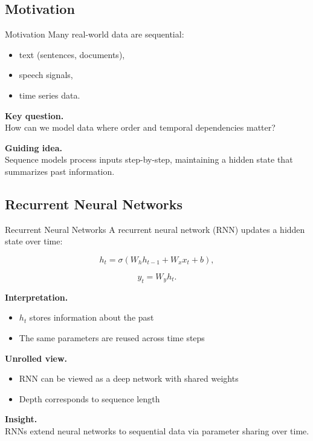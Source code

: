 \documentclass[aspectratio=169,11pt]{beamer}
\begin{document}
\subsection{Motivation}
\begin{frame}[t,allowframebreaks]{Motivation}
\small
Many real-world data are sequential:

\begin{itemize}
    \item text (sentences, documents),
    \item speech signals,
    \item time series data.
\end{itemize}

\textbf{Key question.}\\ How can we model data where order and temporal dependencies matter?

\textbf{Guiding idea.}\\ Sequence models process inputs step-by-step, maintaining a hidden state that summarizes past information.
\end{frame}

\subsection{Recurrent Neural Networks}
\begin{frame}[t,allowframebreaks]{Recurrent Neural Networks}
\small
A recurrent neural network (RNN) updates a hidden state over time:

\[
h_t = \sigma(W_h h_{t-1} + W_x x_t + b),
\]

\[
y_t = W_y h_t.
\]

\textbf{Interpretation.}\\ \begin{itemize}
    \item $h_t$ stores information about the past
    \item The same parameters are reused across time steps
\end{itemize}

\textbf{Unrolled view.}\\ \begin{itemize}
    \item RNN can be viewed as a deep network with shared weights
    \item Depth corresponds to sequence length
\end{itemize}

\textbf{Insight.}\\ RNNs extend neural networks to sequential data via parameter sharing over time.
\end{frame}
\end{document}
